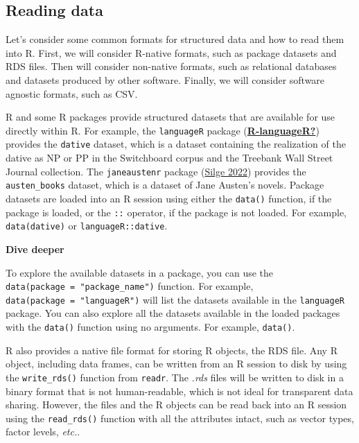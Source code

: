 \documentclass[
  letterpaper,
  DIV=11,
  numbers=noendperiod]{scrreport}
\theoremstyle{definition}
\theoremstyle{remark}
\begin{document}
\hypertarget{reading-data-1}{%
\subsection{Reading data}\label{reading-data-1}}

Let's consider some common formats for structured data and how to read
them into R. First, we will consider R-native formats, such as package
datasets and RDS files. Then will consider non-native formats, such as
relational databases and datasets produced by other software. Finally,
we will consider software agnostic formats, such as CSV.

R and some R packages provide structured datasets that are available for
use directly within R. For example, the \texttt{languageR} package
(\protect\hyperlink{ref-R-languageR}{\textbf{R-languageR?}}) provides
the \texttt{dative} dataset, which is a dataset containing the
realization of the dative as NP or PP in the Switchboard corpus and the
Treebank Wall Street Journal collection. The \texttt{janeaustenr}
package (\protect\hyperlink{ref-R-janeaustenr}{Silge 2022}) provides the
\texttt{austen\_books} dataset, which is a dataset of Jane Austen's
novels. Package datasets are loaded into an R session using either the
\texttt{data()} function, if the package is loaded, or the \texttt{::}
operator, if the package is not loaded. For example,
\texttt{data(dative)} or \texttt{languageR::dative}.

\begin{tcolorbox}[enhanced jigsaw, leftrule=.75mm, bottomrule=.15mm, opacityback=0, breakable, left=2mm, colback=white, toprule=.15mm, arc=.35mm, rightrule=.15mm]

\textbf{ Dive deeper}

To explore the available datasets in a package, you can use the
\texttt{data(package\ =\ "package\_name")} function. For example,
\texttt{data(package\ =\ "languageR")} will list the datasets available
in the \texttt{languageR} package. You can also explore all the datasets
available in the loaded packages with the \texttt{data()} function using
no arguments. For example, \texttt{data()}.

\end{tcolorbox}

R also provides a native file format for storing R objects, the RDS
file. Any R object, including data frames, can be written from an R
session to disk by using the \texttt{write\_rds()} function from
\texttt{readr}. The \emph{.rds} files will be written to disk in a
binary format that is not human-readable, which is not ideal for
transparent data sharing. However, the files and the R objects can be
read back into an R session using the \texttt{read\_rds()} function with
all the attributes intact, such as vector types, factor levels,
\emph{etc.}.
\end{document}
